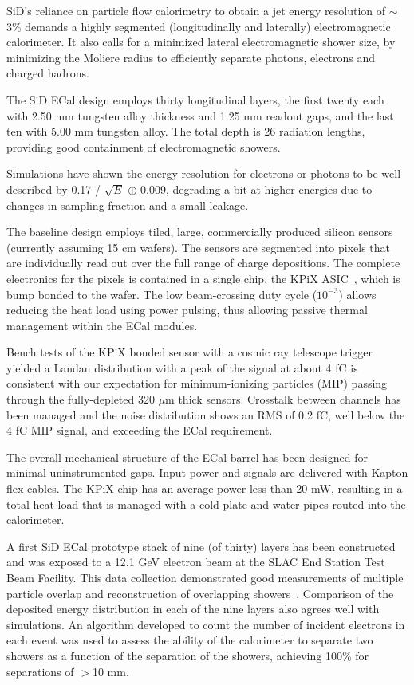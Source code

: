 SiD's reliance on particle flow calorimetry to obtain a jet energy resolution of  $\sim$3\% demands a highly segmented (longitudinally and laterally) electromagnetic calorimeter. It also calls for a minimized lateral electromagnetic shower size, by minimizing the Moliere radius to efficiently separate photons, electrons and charged hadrons.

The SiD ECal design employs thirty longitudinal layers, the first twenty each with 2.50 mm tungsten alloy thickness and 1.25 mm readout gaps, and the last ten with 5.00 mm tungsten alloy.  The total depth is 26 radiation lengths, providing good containment of electromagnetic showers.

Simulations have shown the energy resolution for electrons or photons
to be well described by 0.17 / $\sqrt{E}$ $\oplus$ 0.009, degrading a
bit  at higher energies due to changes in sampling fraction and a small leakage.

The baseline design employs tiled, large, commercially produced silicon sensors (currently assuming 15 cm wafers). The sensors are segmented into pixels that are individually read out over the full range of charge depositions. The complete electronics for the pixels is contained in a single chip, the KPiX ASIC~\cite{Brau:2013yb}, which is bump bonded to the wafer. The low beam-crossing duty cycle ($10^{-3}$) allows reducing the heat load using power pulsing, thus allowing passive thermal management within the ECal modules.

Bench tests of the KPiX bonded sensor  with a cosmic ray telescope trigger yielded 
a Landau distribution with a peak of the signal at about 4 fC is consistent with our expectation for minimum-ionizing particles (MIP) passing through the fully-depleted 320 $\mu$m thick sensors. Crosstalk between channels has been managed and the 
 noise distribution shows an RMS of 0.2 fC, well below the 4 fC MIP signal, and exceeding the ECal requirement.

The overall mechanical structure of the ECal barrel has been designed for minimal uninstrumented gaps. Input power and signals are delivered with Kapton flex cables.
The KPiX chip has an average power less than 20 mW, resulting in a
total heat load  that is managed with a cold plate and water pipes routed 
into the calorimeter.

A first SiD ECal prototype stack of nine (of thirty) layers has been constructed and was exposed to a 12.1 GeV electron beam at the SLAC End Station Test Beam Facility. 
This data collection demonstrated good measurements of multiple particle overlap and reconstruction of overlapping showers~\cite{Steinhebel:2017qze}.  Comparison of the deposited energy distribution in each of the nine layers also agrees well with simulations.
An algorithm developed to count the number of incident electrons in each event was used to assess the ability of the calorimeter to separate two showers as a function of the separation of the showers, achieving 100\% for separations of $>$10 mm.



